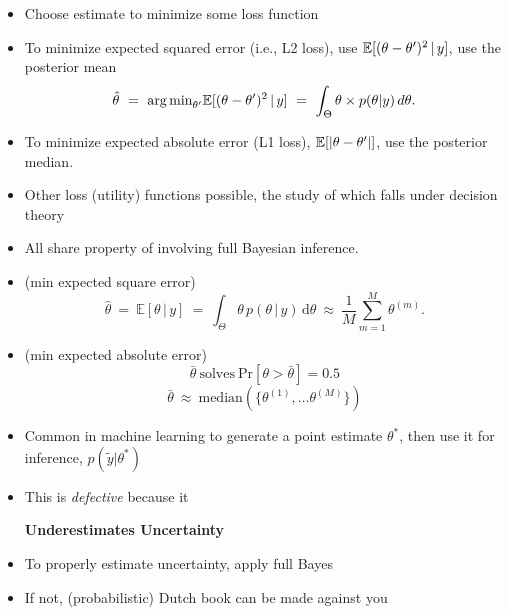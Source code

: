 \documentclass[10pt]{report}
\begin{document}
%
\begin{itemize}
\item Choose estimate to minimize some loss function
\item To minimize expected squared error (i.e., L2 loss), use
$\mathbb{E}[(\theta - \theta')^2 \, | \, y]$, use the posterior mean
\[
\hat{\theta}
\ = \ \mbox{arg\,min}_{\theta'} \mathbb{E}[(\theta - \theta')^2 \, | \, y]
\ = \ \int_{\Theta} \theta \times p(\theta|y) \, d\theta.
\]
\item To minimize expected absolute error (L1 loss), $\mathbb{E}[|\theta -
    \theta'|]$, use the posterior median.
\item Other loss (utility) functions possible, the study of which falls under
  decision theory
\item All share property of involving full Bayesian inference.
\end{itemize}


%
\begin{itemize}
\item {} (min expected square error)
\[
\hat{\theta}
\ = \
\mathbb{E}\left[\theta \, | \, y \right]
\ = \
\int_{\Theta} \theta \, p(\theta \, | \, y) \, \mathrm{d}\theta
\ \approx \
\frac{1}{M} \sum_{m=1}^M \theta^{(m)}.
\]
%
\item {} (min expected absolute error)
\[
\bar{\theta} \ \mbox{solves} \ \mbox{Pr}[\theta > \bar{\theta}] = 0.5
\]
\[
\bar{\theta} \ \approx \ \mbox{median}(\{ \theta^{(1)}, \ldots
\theta^{(M)} \})
\]
\vspace*{-12pt}
\end{itemize}


%
\begin{itemize}
\item Common in machine learning to generate a point estimate
  $\theta^*$, then use it for inference, $p(\tilde{y} | \theta^{*})$
\item This is \emph{defective} because it
\vspace*{-1pt}
\begin{center}
{\Large\bfseries Underestimates Uncertainty}
\end{center}
\item To properly estimate uncertainty, apply full Bayes
\item If not, (probabilistic) Dutch book can be made against you
\end{itemize}
\end{document}
